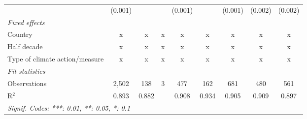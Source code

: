 \begin{table}[htbp]
\begin{tabular}{lcccccccc}
                                                                        & (0.001)        &                           &              & (0.001)        &                  & (0.001)         & (0.002)         & (0.002)\\   
      \emph{Fixed effects}\\
      Country                                                           & x              & x                         & x            & x              & x                & x               & x               & x\\  
      Half decade                                                       & x              & x                         & x            & x              & x                & x               & x               & x\\  
      Type of climate action/measure                                    & x              & x                         & x            & x              & x                & x               & x               & x\\  
      \midrule \emph{Fit statistics}\\
      Observations                                                      & 2,502          & 138                       & 3            & 477            & 162              & 681             & 480             & 561\\  
      R$^2$                                                             & 0.893          & 0.882                     &              & 0.908          & 0.934            & 0.905           & 0.909           & 0.897\\  
      \midrule
      \multicolumn{9}{l}{\emph{Signif. Codes: ***: 0.01, **: 0.05, *: 0.1}}\\
   \end{tabular}
\end{table}


